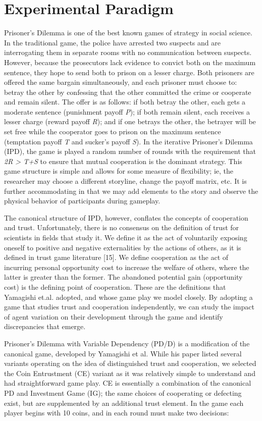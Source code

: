 \documentclass{sig-alternate}
\begin{document}
\section{Experimental Paradigm}
Prisoner's Dilemma is one of the best known games of strategy in social science. In the traditional game, the police have arrested two suspects and are interrogating them in separate rooms with no communication between suspects. However, because the prosecutors lack evidence to convict both on the maximum sentence, they hope to send both to prison on a lesser charge. Both prisoners are offered the same bargain simultaneously, and each prisoner must choose to: betray the other by confessing that the other committed the crime or cooperate and remain silent. The offer is as follows: if both betray the other, each gets a moderate sentence (punishment payoff \textit{P}); if both remain silent, each receives a lesser charge (reward payoff \textit{R}); and if one betrays the other, the betrayer will be set free while the cooperator goes to prison on the maximum sentence (temptation payoff \textit{T} and sucker's payoff \textit{S}). In the iterative Prisoner's Dilemma (IPD), the game is played a random number of rounds with the requirement that \textit{2R > T+S} to ensure that mutual cooperation is the dominant strategy. This game structure is simple and allows for some measure of flexibility; ie, the researcher may choose a different storyline, change the payoff matrix, etc. It is further accommodating in that we may add elements to the story and observe the physical behavior of participants during gameplay. 

The canonical structure of IPD, however, conflates the concepts of cooperation and trust. Unfortunately, there is no consensus on the definition of trust for scientists in fields that study it. We define it as the act of voluntarily exposing oneself to positive and negative externalities by the actions of others, as it is defined in trust game literature [15]. We define cooperation as the act of incurring personal opportunity cost to increase the welfare of others, where the latter is greater than the former. The abandoned potential gain (opportunity cost) is the defining point of cooperation. These are the definitions that Yamagishi et.al. adopted, and whose game play we model closely. By adopting a game that studies trust and cooperation independently, we can study the impact of agent variation on their development through the game and identify discrepancies that emerge.

Prisoner's Dilemma with Variable Dependency (PD/D) is a modification of the canonical game, developed by Yamagishi et al. While his paper listed several variants operating on the idea of distinguished trust and cooperation, we selected the Coin Entrustment (CE) variant as it was relatively simple to understand and had straightforward game play. CE is essentially a combination of the canonical PD and Investment Game (IG); the same choices of cooperating or defecting exist, but are supplemented by an additional trust element. In the game each player begins with 10 coins, and in each round must make two decisions:
\end{document}
